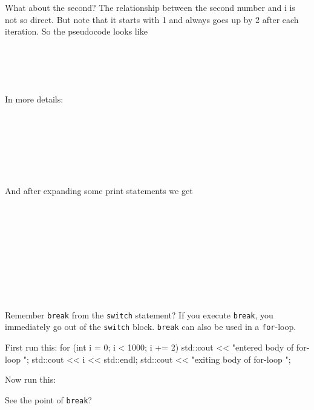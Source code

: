 \begin{console}
\begin{ex}
What about the second? The relationship between the second number and i
is not so direct. But note that it starts with 1 and always goes up by 2
after each iteration. So the pseudocode looks like
     
      \\
      \\
              \\
              \\

In more details:

      \\
      \\
          \\
          \\
          \\
          \\

And after expanding some print statements we get

      \\
      \\
            \\
            \\
            \\
            \\
            \\
            \\

\end{ex}
\newpage{}

Remember \texttt{break} from the \texttt{switch} statement? If you execute
\texttt{break}, you immediately go out of the \texttt{switch} block.
\texttt{break} can also be used in a \texttt{for}-loop.
\begin{console}
First run this:
for (int i = 0; i < 1000; i += 2)
{
std::cout << "entered body of for-loop \n";
std::cout << i << std::endl;
std::cout << "exiting body of for-loop \n";
} 
\end{console}
Now run this:
See the point of \texttt{break}?


\end{console}
